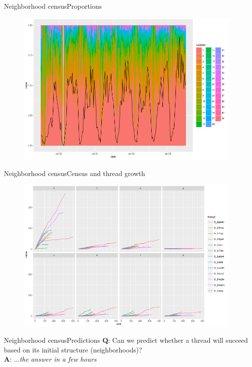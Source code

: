 \documentclass{beamer}
\begin{document}
\begin{frame}{Neighborhood census}{Proportions}
	\begin{figure}
		\centering
		\includegraphics[width=1\textwidth]{census_proportions}	
	\end{figure}
\end{frame}

\begin{frame}{Neighborhood census}{Census and thread growth}
	\begin{figure}
		\centering
		\includegraphics[width=1\textwidth]{census_length}	
	\end{figure}
\end{frame}

\begin{frame}{Neighborhood census}{Predictions}
	\textbf{Q}: Can we predict whether a thread will succeed based on its initial structure (neighborhoods)?\\
	\textbf{A}: ...\textit{the answer in a few hours}
\end{frame}
\end{document}
